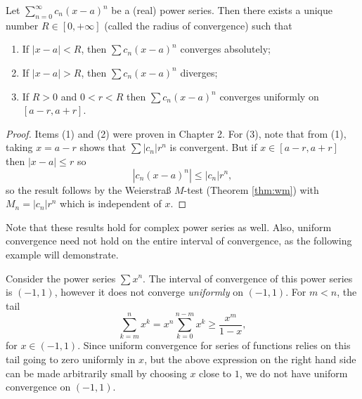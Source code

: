 \documentclass[../analysis1.tex]{subfiles}
\begin{document}
\begin{theorem}
    \begin{shaded*}
        Let $\sum_{n=0}^{\infty}c_n(x-a)^n$ be a (real) power series. Then there exists a unique number $R\in[0,+\infty]$ (called the radius of convergence) such that
        \begin{enumerate}
            \item If $|x-a|<R$, then $\sum c_n(x-a)^n$ converges absolutely;
            \item If $|x-a|>R$, then $\sum c_n(x-a)^n$ diverges;
            \item If $R>0$ and $0<r<R$ then $\sum c_n(x-a)^n$ converges uniformly on $[a-r,a+r]$.
        \end{enumerate}
    \end{shaded*}
\end{theorem}
\begin{proof}
    Items (1) and (2) were proven in Chapter 2. 
    For (3), note that from (1), taking $x=a-r$ shows that $\sum |c_n|r^n$ is convergent. But if $x\in[a-r,a+r]$ then $|x-a|\le r$ so \[|c_n(x-a)^n|\le |c_n|r^n,\]
    so the result follows by the Weierstraß $M$-test (Theorem \ref{thm:wm}) with $M_n=|c_n|r^n$ which is independent of $x$.\qedhere
\end{proof}

Note that these results hold for complex power series as well. Also, uniform convergence need not hold on the entire interval of convergence, as the following example will demonstrate.

\begin{example}
    Consider the power series $\sum x^n$. The interval of convergence of this power series is $(-1,1)$, however it does not converge \textit{uniformly} on $(-1,1)$. For $m<n$, the tail
    \[\sum_{k=m}^n x^k = x^n \sum_{k=0}^{n-m} x^k \ge \frac{x^m}{1-x},\]
    for $x\in (-1,1)$. Since uniform convergence for series of functions relies on this tail going to zero uniformly in $x$, but the above expression on the right hand side can be made arbitrarily small by choosing $x$ close to $1$, we do not have uniform convergence on $(-1,1)$.
\end{example}
\end{document}
